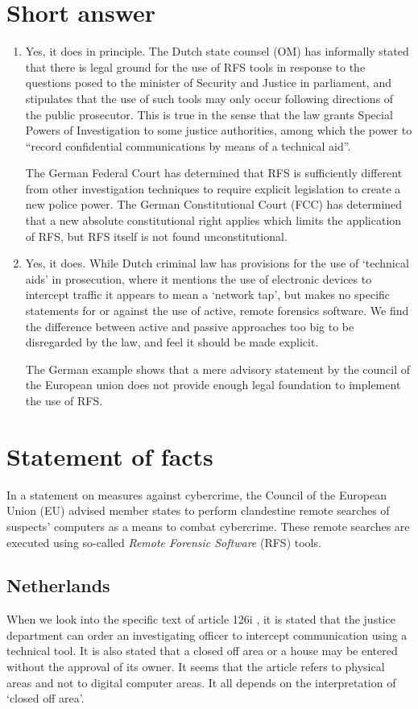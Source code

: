 \documentclass[11pt]{article} %
\begin{document}
\section{Short answer}
\begin{enumerate}
\item{Yes, it does in principle.
The Dutch state counsel (OM) has informally stated that there is legal ground for the use of RFS tools in response to the questions posed to the minister of Security and Justice in parliament, and stipulates that the use of such tools may only occur following directions of the public prosecutor.
This is true in the sense that the law grants Special Powers of Investigation to some justice authorities, among which the power to ``record confidential communications by means of a technical aid''. \cite{bob}

The German Federal Court has determined that RFS is sufficiently different from other investigation techniques to require explicit legislation to create a new police power.
The German Constitutional Court (FCC) has determined that a new absolute constitutional right applies which limits the application of RFS, but RFS itself is not found unconstitutional.
}

\item{Yes, it does.
While Dutch criminal law has provisions for the use of `technical aids' in prosecution, where it mentions the use of electronic devices to intercept traffic it appears to mean a `network tap', but makes no specific statements for or against the use of active, remote forensics software.
We find the difference between active and passive approaches too big to be disregarded by the law, and feel it should be made explicit.

The German example shows that a mere advisory statement by the council of the European union does not provide enough legal foundation to implement the use of RFS.
}
\end{enumerate}

\section{Statement of facts}
In a statement on measures against cybercrime, the Council of the European Union (EU) advised member states to perform clandestine remote searches of suspects' computers as a means to combat cybercrime.
These remote searches are executed using so-called \textit{Remote Forensic Software} (RFS) tools.

\subsection{Netherlands}
When we look into the specific text of article 126i \cite{wb:sv126i}, it is stated that the justice department can order an investigating officer to intercept communication using a technical tool.
It is also stated that a closed off area or a house may be entered without the approval of its owner.
It seems that the article refers to physical areas and not to digital computer areas.
It all depends on the interpretation of `closed off area'.
\end{document}
